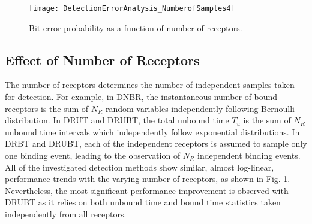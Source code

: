 \documentclass[twocolumn]{IEEEtran}
\begin{document}
\begin{figure}[!t]
	\centering
	\texttt{[image: DetectionErrorAnalysis\_NumberofSamples4]}
	\caption{Bit error probability as a function of number of receptors. }
	\label{fig:NumberofSamples}
\end{figure}

\subsection{Effect of Number of Receptors}
The number of receptors determines the number of independent samples taken for detection. For example, in DNBR, the instantaneous number of bound receptors is the sum of $N_R$ random variables independently following Bernoulli distribution. In DRUT and DRUBT, the total unbound time $T_u$ is the sum of $N_R$ unbound time intervals which independently follow exponential distributions. In DRBT and DRUBT, each of the independent receptors is assumed to sample only one binding event, leading to the observation of $N_R$ independent binding events. All of the investigated detection methods show similar, almost log-linear, performance trends with the varying number of receptors, as shown in Fig. \ref{fig:NumberofSamples}. Nevertheless, the most significant performance improvement is observed with DRUBT as it relies on both unbound time and bound time statistics taken independently from all receptors.

\end{document}
